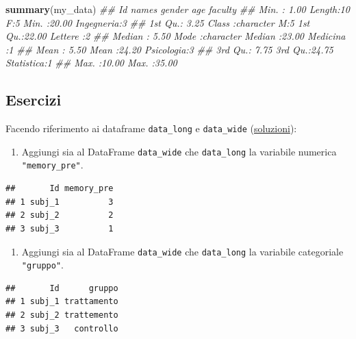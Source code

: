 \documentclass[
]{book}
\newenvironment{Shaded}{\begin{snugshade}}{\end{snugshade}}
\newcommand{\CommentTok}[1]{\textcolor[rgb]{0.56,0.35,0.01}{\textit{#1}}}
\newcommand{\KeywordTok}[1]{\textcolor[rgb]{0.13,0.29,0.53}{\textbf{#1}}}
\newcommand{\NormalTok}[1]{#1}
\providecommand{\tightlist}{%
  \setlength{\itemsep}{0pt}\setlength{\parskip}{0pt}}
\begin{document}
\begin{Shaded}
\begin{Highlighting}[]
\KeywordTok{summary}\NormalTok{(my_data)}
\CommentTok{##        Id           names           gender      age              faculty }
\CommentTok{##  Min.   : 1.00   Length:10          F:5    Min.   :20.00   Ingegneria:3  }
\CommentTok{##  1st Qu.: 3.25   Class :character   M:5    1st Qu.:22.00   Lettere   :2  }
\CommentTok{##  Median : 5.50   Mode  :character          Median :23.00   Medicina  :1  }
\CommentTok{##  Mean   : 5.50                             Mean   :24.20   Psicologia:3  }
\CommentTok{##  3rd Qu.: 7.75                             3rd Qu.:24.75   Statistica:1  }
\CommentTok{##  Max.   :10.00                             Max.   :35.00}
\end{Highlighting}
\end{Shaded}

\hypertarget{esercizi-11}{%
\subsection*{Esercizi}\label{esercizi-11}}

Facendo riferimento ai dataframe \texttt{data\_long} e \texttt{data\_wide} (\href{https://github.com/psicostat/Introduction2R/blob/master/exercises/chapter-10-dataframe.R}{soluzioni}):

\begin{enumerate}
\def\labelenumi{\arabic{enumi}.}
\tightlist
\item
  Aggiungi sia al DataFrame \texttt{data\_wide} che \texttt{data\_long} la variabile numerica \texttt{"memory\_pre"}.
\end{enumerate}

\begin{verbatim}
##       Id memory_pre
## 1 subj_1          3
## 2 subj_2          2
## 3 subj_3          1
\end{verbatim}

\begin{enumerate}
\def\labelenumi{\arabic{enumi}.}
\setcounter{enumi}{1}
\tightlist
\item
  Aggiungi sia al DataFrame \texttt{data\_wide} che \texttt{data\_long} la variabile categoriale \texttt{"gruppo"}.
\end{enumerate}

\begin{verbatim}
##       Id      gruppo
## 1 subj_1 trattamento
## 2 subj_2 trattemento
## 3 subj_3   controllo
\end{verbatim}
\end{document}
